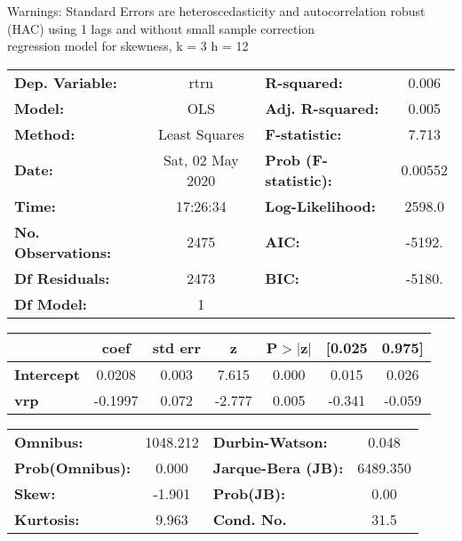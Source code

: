 Warnings: \newline
 [1] Standard Errors are heteroscedasticity and autocorrelation robust (HAC) using 1 lags and without small sample correction\\ 

regression model for skewness, k = 3 h = 12\begin{center}
\begin{tabular}{lclc}
\toprule
\textbf{Dep. Variable:}    &       rtrn       & \textbf{  R-squared:         } &     0.006   \\
\textbf{Model:}            &       OLS        & \textbf{  Adj. R-squared:    } &     0.005   \\
\textbf{Method:}           &  Least Squares   & \textbf{  F-statistic:       } &     7.713   \\
\textbf{Date:}             & Sat, 02 May 2020 & \textbf{  Prob (F-statistic):} &  0.00552    \\
\textbf{Time:}             &     17:26:34     & \textbf{  Log-Likelihood:    } &    2598.0   \\
\textbf{No. Observations:} &        2475      & \textbf{  AIC:               } &    -5192.   \\
\textbf{Df Residuals:}     &        2473      & \textbf{  BIC:               } &    -5180.   \\
\textbf{Df Model:}         &           1      & \textbf{                     } &             \\
\bottomrule
\end{tabular}
\begin{tabular}{lcccccc}
                   & \textbf{coef} & \textbf{std err} & \textbf{z} & \textbf{P$> |$z$|$} & \textbf{[0.025} & \textbf{0.975]}  \\
\midrule
\textbf{Intercept} &       0.0208  &        0.003     &     7.615  &         0.000        &        0.015    &        0.026     \\
\textbf{vrp}       &      -0.1997  &        0.072     &    -2.777  &         0.005        &       -0.341    &       -0.059     \\
\bottomrule
\end{tabular}
\begin{tabular}{lclc}
\textbf{Omnibus:}       & 1048.212 & \textbf{  Durbin-Watson:     } &    0.048  \\
\textbf{Prob(Omnibus):} &   0.000  & \textbf{  Jarque-Bera (JB):  } & 6489.350  \\
\textbf{Skew:}          &  -1.901  & \textbf{  Prob(JB):          } &     0.00  \\
\textbf{Kurtosis:}      &   9.963  & \textbf{  Cond. No.          } &     31.5  \\
\bottomrule
\end{tabular}
\end{center}

